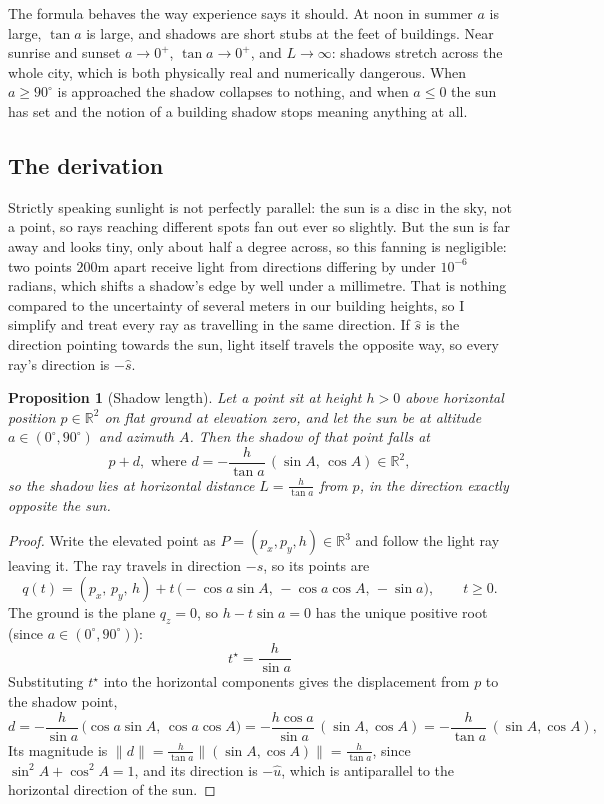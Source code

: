 \documentclass[11pt,a4paper]{article}
\theoremstyle{plain}
\newtheorem{proposition}{Proposition}
\theoremstyle{definition}
\theoremstyle{remark}
\begin{document}
The formula behaves the way experience says it should. At noon in summer $a$ is large, $\tan a$ is large, and shadows are short stubs at the feet of buildings. Near sunrise and sunset $a \to 0^+$, $\tan a \to 0^+$, and $L \to \infty$: shadows stretch across the whole city, which is both physically real and numerically dangerous. When $a \ge 90^\circ$ is approached the shadow collapses to nothing, and when $a \le 0$ the sun has set and the notion of a building shadow stops meaning anything at all.

\subsection{The derivation}

Strictly speaking sunlight is not perfectly parallel: the sun is a disc in the sky, not a point, so rays reaching different spots fan out ever so slightly. But the sun is far away and looks tiny, only about half a degree across, so this fanning is negligible: two points $200$m apart receive light from directions differing by under $10^{-6}$ radians, which shifts a shadow's edge by well under a millimetre. That is nothing compared to the uncertainty of several meters in our building heights, so I simplify and treat every ray as travelling in the same direction. If $\hat{s}$ is the direction pointing towards the sun, light itself travels the opposite way, so every ray's direction is $-\hat{s}$.

\begin{proposition}[Shadow length]
\label{prop:length}
Let a point sit at height $h > 0$ above horizontal position $p \in \mathbb{R}^2$ on flat ground at elevation zero, and let the sun be at altitude $a \in (0^\circ, 90^\circ)$ and azimuth $A$. Then the shadow of that point falls at
$$p + d, \text{ where } d = -\frac{h}{\tan a}\,(\sin A, \,  \cos A) \in \mathbb{R}^2,$$
so the shadow lies at horizontal distance $\displaystyle L = \frac{h}{\tan a}$ from $p$, in the direction exactly opposite the sun.
\end{proposition}

\begin{proof}
Write the elevated point as $P = (p_x, p_y, h) \in \mathbb{R}^3$ and follow the light ray leaving it. The ray travels in direction $-\hat{s}$, so its points are
$$q(t) = (p_x, \,  p_y, \,  h) + t\,\big({-}\cos a \sin A, \, -\cos a \cos A, \, -\sin a\big), \qquad t \ge 0.$$
The ground is the plane $q_z = 0$, so $h - t \sin a = 0$ has the unique positive root (since $a \in (0^\circ,90^\circ)$):
$$t^\star = \frac{h}{\sin a}$$
Substituting $t^\star$ into the horizontal components gives the displacement from $p$ to the shadow point,
$$d = -\frac{h}{\sin a}\,\big(\cos a \sin A, \,  \cos a \cos A\big) = -\frac{h\cos a}{\sin a}\,(\sin A, \cos A) = -\frac{h}{\tan a}\,(\sin A, \cos A),$$
Its magnitude is $\lVert d \rVert = \frac{h}{\tan a} \lVert(\sin A,\cos A)\rVert = \frac{h}{\tan a}$, since $\sin^2 A + \cos^2 A = 1$, and its direction is $-\hat{u}$, which is antiparallel to the horizontal direction of the sun.
\end{proof}
\end{document}
